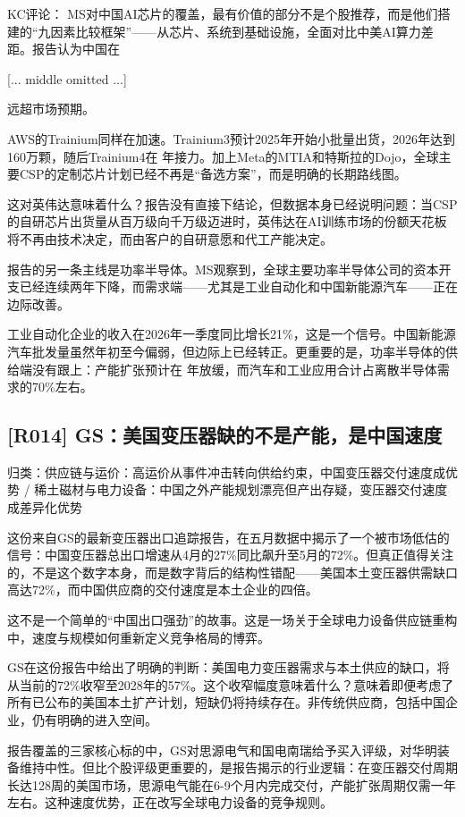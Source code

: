 \documentclass[11pt]{ctexart}
\begin{document}
KC评论： MS对中国AI芯片的覆盖，最有价值的部分不是个股推荐，而是他们搭建的“九因素比较框架”——从芯片、系统到基础设施，全面对比中美AI算力差距。报告认为中国在

[... middle omitted ...]

远超市场预期。

AWS的Trainium同样在加速。Trainium3预计2025年开始小批量出货，2026年达到160万颗，随后Trainium4在 年接力。加上Meta的MTIA和特斯拉的Dojo，全球主要CSP的定制芯片计划已经不再是“备选方案”，而是明确的长期路线图。

这对英伟达意味着什么？报告没有直接下结论，但数据本身已经说明问题：当CSP的自研芯片出货量从百万级向千万级迈进时，英伟达在AI训练市场的份额天花板将不再由技术决定，而由客户的自研意愿和代工产能决定。

报告的另一条主线是功率半导体。MS观察到，全球主要功率半导体公司的资本开支已经连续两年下降，而需求端——尤其是工业自动化和中国新能源汽车——正在边际改善。

工业自动化企业的收入在2026年一季度同比增长21\%，这是一个信号。中国新能源汽车批发量虽然年初至今偏弱，但边际上已经转正。更重要的是，功率半导体的供给端没有跟上：产能扩张预计在 年放缓，而汽车和工业应用合计占离散半导体需求的70\%左右。

\subsection{[R014] GS：美国变压器缺的不是产能，是中国速度}
{\small\color{refgray}归类：供应链与运价：高运价从事件冲击转向供给约束，中国变压器交付速度成优势 / 稀土磁材与电力设备：中国之外产能规划漂亮但产出存疑，变压器交付速度成差异化优势}

这份来自GS的最新变压器出口追踪报告，在五月数据中揭示了一个被市场低估的信号：中国变压器总出口增速从4月的27\%同比飙升至5月的72\%。但真正值得关注的，不是这个数字本身，而是数字背后的结构性错配——美国本土变压器供需缺口高达72\%，而中国供应商的交付速度是本土企业的四倍。

这不是一个简单的“中国出口强劲”的故事。这是一场关于全球电力设备供应链重构中，速度与规模如何重新定义竞争格局的博弈。

GS在这份报告中给出了明确的判断：美国电力变压器需求与本土供应的缺口，将从当前的72\%收窄至2028年的57\%。这个收窄幅度意味着什么？意味着即便考虑了所有已公布的美国本土扩产计划，短缺仍将持续存在。非传统供应商，包括中国企业，仍有明确的进入空间。

报告覆盖的三家核心标的中，GS对思源电气和国电南瑞给予买入评级，对华明装备维持中性。但比个股评级更重要的，是报告揭示的行业逻辑：在变压器交付周期长达128周的美国市场，思源电气能在6-9个月内完成交付，产能扩张周期仅需一年左右。这种速度优势，正在改写全球电力设备的竞争规则。
\end{document}
